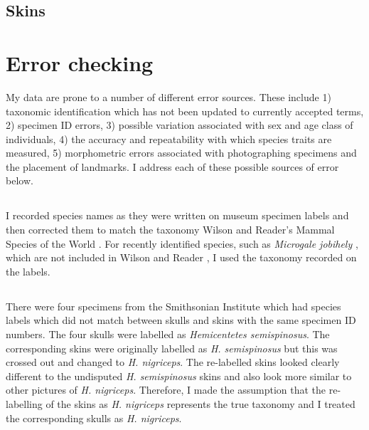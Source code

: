 \subsection{Skins}

\section{Error checking}
My data are prone to a number of different error sources. These include 1) taxonomic identification which has not been updated to currently accepted terms, 2) specimen ID errors, 3) possible variation associated with sex and age class of individuals, 4) the accuracy and repeatability with which species traits are measured, 5) morphometric errors associated with photographing specimens and the placement of landmarks. I address each of these possible sources of error below.  

\subsection{}
I recorded species names as they were written on museum specimen labels and then corrected them to match the taxonomy Wilson and Reader’s Mammal Species of the World \citeyearpar{Wilson2005}. For recently identified species, such as \textit{Microgale jobihely} \citep{Goodman2006}, which are not included in Wilson and Reader \citeyearpar{Wilson2005}, I used the taxonomy recorded on the labels. 

\subsection{}
	
There were four specimens from the Smithsonian Institute which had species labels which did not match between skulls and skins with the same specimen ID numbers. The four skulls were labelled as \textit{Hemicentetes semispinosus}. The corresponding skins were originally labelled as \textit{H. semispinosus} but this was crossed out and changed to \textit{H. nigriceps}. The re-labelled skins looked clearly different to the undisputed \textit{H. semispinosus} skins and also look more similar to other pictures of \textit{H. nigriceps}. Therefore, I made the assumption that the re-labelling of the skins as \textit{H. nigriceps} represents the true taxonomy and I treated the corresponding skulls as \textit{H. nigriceps}.

